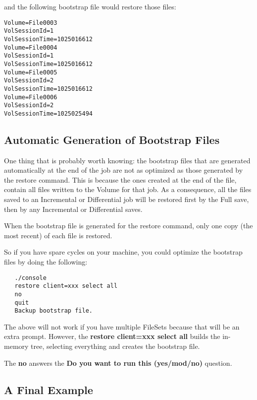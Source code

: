 and the following bootstrap file would restore those files: 

\footnotesize
\begin{verbatim}
Volume=File0003
VolSessionId=1
VolSessionTime=1025016612
Volume=File0004
VolSessionId=1
VolSessionTime=1025016612
Volume=File0005
VolSessionId=2
VolSessionTime=1025016612
Volume=File0006
VolSessionId=2
VolSessionTime=1025025494
\end{verbatim}
\normalsize

\subsection*{Automatic Generation of Bootstrap Files}

One thing that is probably worth knowing: the bootstrap files that are
generated automatically at the end of the job are not as optimized as those
generated by the restore command. This is because the ones created at the end
of the file, contain all files written to the Volume for that job. As a
consequence, all the files saved to an Incremental or Differential job will be
restored first by the Full save, then by any Incremental or Differential
saves. 

When the bootstrap file is generated for the restore command, only one copy
(the most recent) of each file is restored. 

So if you have spare cycles on your machine, you could optimize the bootstrap
files by doing the following: 

\footnotesize
\begin{verbatim}
   ./console
   restore client=xxx select all
   no
   quit
   Backup bootstrap file.
\end{verbatim}
\normalsize

The above will not work if you have multiple FileSets because that will be an
extra prompt. However, the {\bf restore client=xxx select all} builds the
in-memory tree, selecting everything and creates the bootstrap file. 

The {\bf no} answers the {\bf Do you want to run this (yes/mod/no)} question. 

\subsection*{A Final Example}

